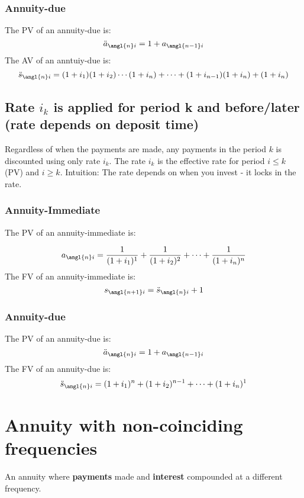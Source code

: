\subsubsection{Annuity-due}
\begin{comments}
    The PV of an annuity-due is:
    \[ \ddot{a}_{\angl{n}i} = 1 + a_{\angl{n-1}i} \] 
    The AV of an anntuiy-due is: 
    \[ \ddot{s}_{\angl{n}i} = (1 + i_1)(1 + i_2)\cdots(1 + i_n) + \cdots + (1 + i_{n-1})(1 + i_n) + (1 + i_n) \]
\end{comments}


\subsection{Rate $i_k$ is applied for period k and before/later (rate depends on deposit time)}

\begin{comments}
    Regardless of when the payments are made, any payments in the period $k$ is discounted using only rate $i_k$. 
    The rate $i_k$ is the effective rate for period $i\leq k$ (PV) and $i\ge k$.  Intuition: The rate depends on 
    when you invest - it locks in the rate. 
\end{comments}


\subsubsection{Annuity-Immediate}
The PV of an annuity-immediate is:  

\[ a_{\angl{n}i} = \frac{1}{(1 + i_1)^1} + \frac{1}{(1 + i_2)^2} + \cdots + \frac{1}{(1 + i_n)^n}\]
The FV of an annuity-immediate is:  
\[s_{\angl{n+1}i} = \ddot{s}_{\angl{n}i} + 1 \]

\subsubsection{Annuity-due}
The PV of an annuity-due is:
\[\ddot{a}_{\angl{n}i} = 1 + a_{\angl{n-1}i}\]
The FV of an annuity-due is:
\[\ddot{s}_{\angl{n}i} = (1 + i_1)^n + (1 + i_2)^{n-1} + \cdots + (1 + i_n)^1\]






\section{Annuity with non-coinciding frequencies}
\begin{definition}
    An annuity where \textbf{payments} made and \textbf{interest} compounded at a different frequency. 
\end{definition}


